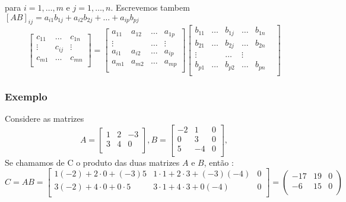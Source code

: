 \documentclass{article}
\begin{document}
para $i = 1, \hdots, m$ e $j = 1, \hdots, n$. Escrevemos tambem $[AB]_{ij} = a_{i1}b_{1j} + a_{i2}b_{2j} + \hdots + a_{ip}b_{pj}$
\begin{equation}
    \begin{bmatrix}
        c_{11} & \hdots & c_{1n} \\
        \vdots & c_{ij} & \vdots \\
        c_{m1} & \hdots & c_{mn} \\
    \end{bmatrix}
    =
    \begin{bmatrix}
        a_{11} & a_{12} & \hdots & a_{1p} \\
        \vdots & & \hdots & \vdots \\
        a_{i1} & a_{i2} & \hdots & a_{ip} \\
        a_{m1} & a_{m2} & \hdots & a_{mp} \\
    \end{bmatrix}
    \begin{bmatrix}
        b_{11} & \hdots & b_{1j} & \hdots & b_{1n} \\
        b_{21} & \hdots & b_{2j} & \hdots & b_{2n} \\
        \vdots & & \hdots & \vdots & \\
        b_{p1} & \hdots & b_{p2} & \hdots & b_{pn} & \\
    \end{bmatrix}
\end{equation}

\subsubsection{Exemplo}
Considere as matrizes
\begin{equation*}
    A = 
    \begin{bmatrix}
        1 & 2 & -3 \\
        3 & 4 & 0 \\
    \end{bmatrix},
    B = 
    \begin{bmatrix}
        -2 & 1 & 0 \\
        0 & 3 & 0 \\
        5 & -4 & 0 \\
    \end{bmatrix},
\end{equation*}
Se chamamos de C o produto das duas matrizes $A$ e $B$, então :
\begin{equation*}
    C = AB =
    \begin{bmatrix}
        1(-2) +2 \cdot 0 +(-3)5 & 1 \cdot 1 +2 \cdot 3 +(-3)(-4) & 0 \\
        3(-2) +4 \cdot 0 + 0 \cdot 5 & 3 \cdot 1 + 4 \cdot 3 + 0(-4) & 0 \\
    \end{bmatrix}
    =
    \begin{pmatrix}
        -17 & 19  & 0 \\
        -6 & 15 & 0 \\
    \end{pmatrix}
\end{equation*}
\end{document}
